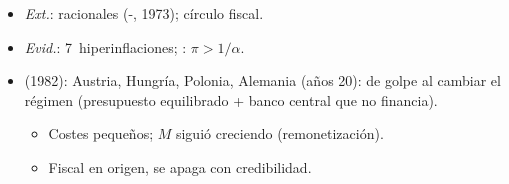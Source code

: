 \documentclass{article}
\begin{document}
\begin{columnas}
\begin{itemize}
\item \emph{Ext.}: racionales (-, 1973); círculo fiscal.
\item \emph{Evid.}: 7~hiperinflaciones; : $\pi>1/\alpha$.
\end{itemize}
\begin{itemize}
\item {} (1982): Austria, Hungría, Polonia, Alemania (años 20): de golpe al cambiar el régimen (presupuesto equilibrado + banco central que no financia).
  \begin{itemize}
  \item Costes pequeños; $M$ siguió creciendo (remonetización).
  \item Fiscal en origen, se apaga con credibilidad.
  \end{itemize}
\end{itemize}


\end{columnas}
\end{document}

